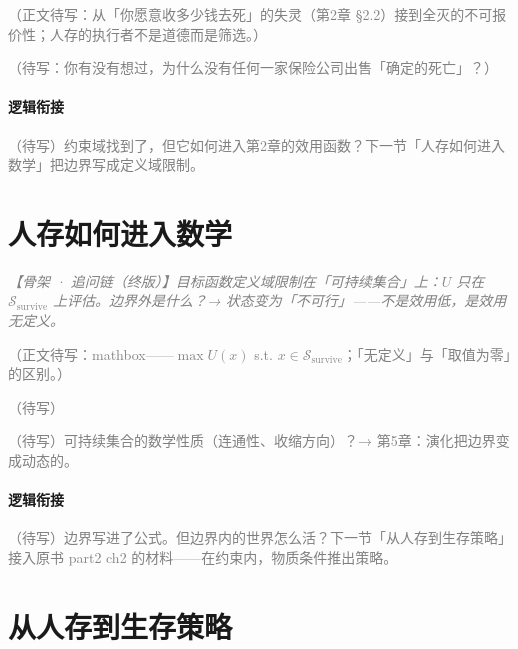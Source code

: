 \documentclass[../../main2.tex]{subfiles}
\begin{document}
	\textcolor{gray}{（正文待写：从「你愿意收多少钱去死」的失灵（第2章 §2.2）接到全灭的不可报价性；人存的执行者不是道德而是筛选。）}

	\begin{readingnote}
		\textcolor{gray}{（待写：你有没有想过，为什么没有任何一家保险公司出售「确定的死亡」？）}
	\end{readingnote}

	\paragraph*{逻辑衔接}
	\textcolor{gray}{（待写）约束域找到了，但它如何进入第2章的效用函数？下一节「人存如何进入数学」把边界写成定义域限制。}

	\section{人存如何进入数学}
	\label{sec:surv-math}

	\textcolor{gray}{\textit{【骨架 · 追问链（终版）】目标函数定义域限制在「可持续集合」上：$U$ 只在 $\mathcal{S}_{\text{survive}}$ 上评估。边界外是什么？→ 状态变为「不可行」——不是效用低，是效用无定义。}}

	\textcolor{gray}{（正文待写：mathbox——$\max U(x)$ s.t. $x \in \mathcal{S}_{\text{survive}}$；「无定义」与「取值为零」的区别。）}

	\begin{readingnote}
		\textcolor{gray}{（待写）}
	\end{readingnote}

	\begin{reader_anticipation}
		\item \textcolor{gray}{（待写）可持续集合的数学性质（连通性、收缩方向）？→ 第5章：演化把边界变成动态的。}
	\end{reader_anticipation}

	\paragraph*{逻辑衔接}
	\textcolor{gray}{（待写）边界写进了公式。但边界内的世界怎么活？下一节「从人存到生存策略」接入原书 part2 ch2 的材料——在约束内，物质条件推出策略。}

	\section{从人存到生存策略}
	\label{sec:surv-strategy}
\end{document}
